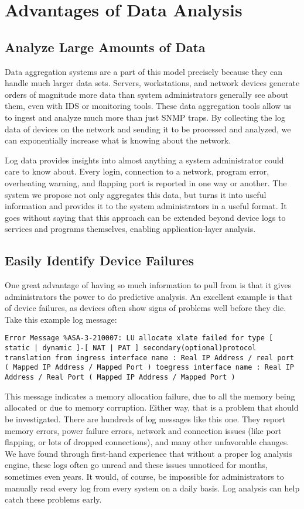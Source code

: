 \documentclass{acm_proc_article-sp}
\begin{document}
\section{Advantages of Data Analysis}
\subsection{Analyze Large Amounts of Data}
Data aggregation systems are a part of this model precisely because they can handle much larger data sets.  Servers, workstations, and network devices generate orders of magnitude more data than system administrators generally see about them, even with IDS or monitoring tools.  These data aggregation tools allow us to ingest and analyze much more than just SNMP traps.  By collecting the log data of devices on the network and sending it to be processed and analyzed, we can exponentially increase what is knowing about the network.

Log data provides insights into almost anything a system administrator could care to know about.  Every login, connection to a network, program error, overheating warning, and flapping port is reported in one way or another.  The system we propose not only aggregates this data, but turns it into useful information and provides it to the system administrators in a useful format.  It goes without saying that this approach can be extended beyond device logs to services and programs themselves, enabling application-layer analysis.

\subsection{Easily Identify Device Failures}
One great advantage of having so much information to pull from is that it gives administrators the power to do predictive analysis.  An excellent example is that of device failures, as devices often show signs of problems well before they die.  Take this example log message:

\texttt{Error Message \%ASA-3-210007: LU allocate xlate failed for type [ static | dynamic ]-[ NAT | PAT ] secondary(optional)protocol translation from ingress interface name : Real IP Address / real port ( Mapped IP Address / Mapped Port ) toegress interface name : Real IP Address / Real Port ( Mapped IP Address / Mapped Port )}

This message indicates a memory allocation failure, due to all the memory being allocated or due to memory corruption.  Either way, that is a problem that should be investigated.  There are hundreds of log messages like this one.  They report memory errors, power failure errors, network and connection issues (like port flapping, or lots of dropped connections), and many other unfavorable changes.  We have found through first-hand experience that without a proper log analysis engine, these logs often go unread and these issues unnoticed for months, sometimes even years.  It would, of course, be impossible for administrators to manually read every log from every system on a daily basis.  Log analysis can help catch these problems early.
\end{document}
